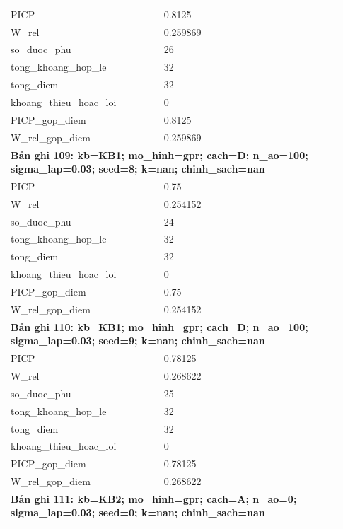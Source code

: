\begin{longtable}{p{0.43\linewidth}p{0.50\linewidth}}
PICP & 0.8125 \\
W\_\allowbreak rel & 0.259869 \\
so\_\allowbreak duoc\_\allowbreak phu & 26 \\
tong\_\allowbreak khoang\_\allowbreak hop\_\allowbreak le & 32 \\
tong\_\allowbreak diem & 32 \\
khoang\_\allowbreak thieu\_\allowbreak hoac\_\allowbreak loi & 0 \\
PICP\_\allowbreak gop\_\allowbreak diem & 0.8125 \\
W\_\allowbreak rel\_\allowbreak gop\_\allowbreak diem & 0.259869 \\
\midrule
\multicolumn{2}{p{0.95\linewidth}}{\textbf{Bản ghi 109: kb=KB1; mo\_hinh=gpr; cach=D; n\_ao=100; sigma\_lap=0.03; seed=8; k=nan; chinh\_sach=nan}} \\
PICP & 0.75 \\
W\_\allowbreak rel & 0.254152 \\
so\_\allowbreak duoc\_\allowbreak phu & 24 \\
tong\_\allowbreak khoang\_\allowbreak hop\_\allowbreak le & 32 \\
tong\_\allowbreak diem & 32 \\
khoang\_\allowbreak thieu\_\allowbreak hoac\_\allowbreak loi & 0 \\
PICP\_\allowbreak gop\_\allowbreak diem & 0.75 \\
W\_\allowbreak rel\_\allowbreak gop\_\allowbreak diem & 0.254152 \\
\midrule
\multicolumn{2}{p{0.95\linewidth}}{\textbf{Bản ghi 110: kb=KB1; mo\_hinh=gpr; cach=D; n\_ao=100; sigma\_lap=0.03; seed=9; k=nan; chinh\_sach=nan}} \\
PICP & 0.78125 \\
W\_\allowbreak rel & 0.268622 \\
so\_\allowbreak duoc\_\allowbreak phu & 25 \\
tong\_\allowbreak khoang\_\allowbreak hop\_\allowbreak le & 32 \\
tong\_\allowbreak diem & 32 \\
khoang\_\allowbreak thieu\_\allowbreak hoac\_\allowbreak loi & 0 \\
PICP\_\allowbreak gop\_\allowbreak diem & 0.78125 \\
W\_\allowbreak rel\_\allowbreak gop\_\allowbreak diem & 0.268622 \\
\midrule
\multicolumn{2}{p{0.95\linewidth}}{\textbf{Bản ghi 111: kb=KB2; mo\_hinh=gpr; cach=A; n\_ao=0; sigma\_lap=0.03; seed=0; k=nan; chinh\_sach=nan}} \\

\end{longtable}
